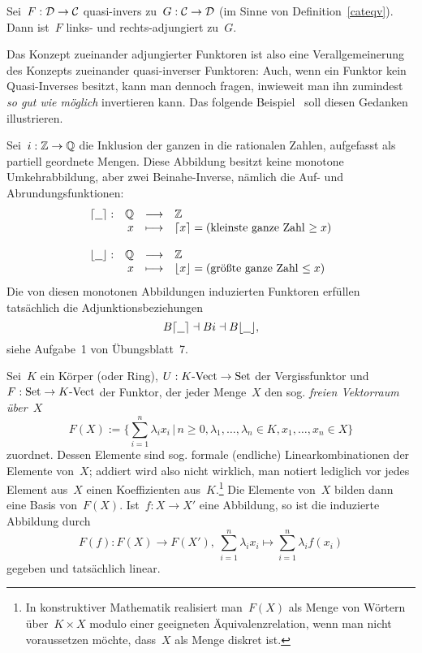 \begin{bsp}Sei~$F:\mathcal{D} \to \mathcal{C}$ quasi-invers zu~$G:\mathcal{C} \to \mathcal{D}$ (im Sinne von
Definition~\ref{cateqv}). Dann ist~$F$ links- und rechts-adjungiert
zu~$G$.\end{bsp}
Das Konzept zueinander adjungierter Funktoren ist also eine Verallgemeinerung
des Konzepts zueinander quasi-inverser Funktoren: Auch, wenn ein Funktor kein
Quasi-Inverses besitzt, kann man dennoch fragen, inwieweit man ihn zumindest
\emph{so gut wie möglich} invertieren kann. Das folgende Beispiel~\cite{smith}
soll diesen Gedanken illustrieren.

\begin{bsp}Sei~$i:\mathbb{Z} \to \mathbb{Q}$ die Inklusion der ganzen in die rationalen Zahlen,
aufgefasst als partiell geordnete Mengen. Diese Abbildung besitzt keine
monotone Umkehrabbildung, aber zwei Beinahe-Inverse, nämlich die Auf- und
Abrundungsfunktionen:
\[ \begin{array}{@{}rrcl@{}}
  \lceil \freist \rceil : & \QQ &\longrightarrow& \ZZ \\
  & x &\longmapsto& \lceil x \rceil = \text{(kleinste ganze Zahl $\geq x$)} \\\\
  \lfloor \freist \rfloor : & \QQ &\longrightarrow& \ZZ \\
  & x &\longmapsto& \lfloor x \rfloor = \text{(größte ganze Zahl $\leq x$)}
\end{array} \]
Die von diesen monotonen Abbildungen induzierten Funktoren erfüllen tatsächlich
die Adjunktionsbeziehungen
\[ B\lceil\underline{\ \ }\rceil \dashv Bi \dashv B\lfloor\underline{\ \ }\rfloor, \]
siehe Aufgabe~1 von Übungsblatt~7.\end{bsp}

\begin{bsp}Sei~$K$ ein Körper (oder Ring), $U : {K\text{-}\mathrm{Vect}} \to \mathrm{Set}$ der
Vergissfunktor und~$F : \mathrm{Set} \to {K\text{-}\mathrm{Vect}}$ der Funktor, der jeder Menge~$X$
den sog. \emph{freien Vektorraum über~$X$}
\[ F(X) := \Biggl\{ \sum_{i=1}^n \lambda_i x_i \,\Bigg|\,
  n \geq 0, \lambda_1, \ldots, \lambda_n \in K, x_1, \ldots, x_n \in X \Biggr\} \]
zuordnet. Dessen Elemente sind sog. formale (endliche) Linearkombinationen der
Elemente von~$X$; addiert wird also nicht wirklich, man notiert lediglich vor
jedes Element aus~$X$ einen Koeffizienten aus~$K$.\footnote{In konstruktiver
Mathematik realisiert man~$F(X)$ als Menge von Wörtern über~$K \times X$ modulo
einer geeigneten Äquivalenzrelation, wenn man nicht voraussetzen möchte,
dass~$X$ als Menge diskret ist.} Die Elemente von~$X$ bilden dann eine Basis
von~$F(X)$.
Ist~$f : X \to X'$ eine Abbildung, so ist die induzierte
Abbildung durch
\[ F(f) : F(X) \to F(X'),\ \sum_{i=1}^n \lambda_i x_i \mapsto
  \sum_{i=1}^n \lambda_i f(x_i) \]
gegeben und tatsächlich linear.
\end{bsp}

